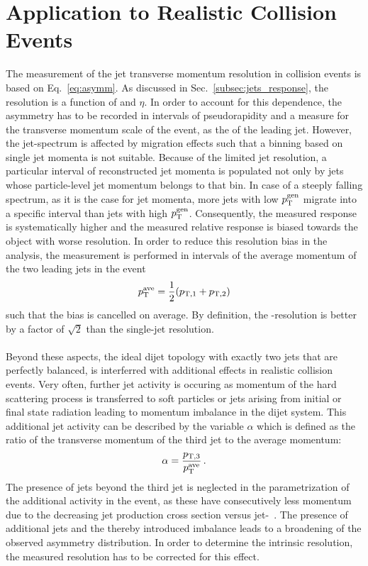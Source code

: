 \section{Application to Realistic Collision Events}
\label{sec:jer_application}
The measurement of the jet transverse momentum resolution in collision events is based on Eq.~\ref{eq:asymm}. As discussed in Sec.~\ref{subsec:jets_response}, the resolution is a function of \pt and $\eta$. In order to account for this dependence, the asymmetry has to be recorded in intervals of pseudorapidity and a measure for the transverse momentum scale of the event, as \eg the \pt of the leading jet. However, the jet-\pt spectrum is affected by migration effects such that a binning based on single jet momenta is not suitable. Because of the limited jet resolution, a particular interval of reconstructed jet momenta is populated not only by jets whose particle-level jet momentum belongs to that bin. In case of a steeply falling spectrum, as it is the case for jet momenta, more jets with low $p_{\text{T}}^\mathrm{gen}$ migrate into a specific interval than jets with high $p_{\text{T}}^\mathrm{gen}$. Consequently, the measured response is systematically higher and the measured relative response is biased towards the object with worse resolution. In order to reduce this resolution bias in the analysis, the measurement is performed in intervals of the average momentum of the two leading jets in the event
\begin{equation}
p^{\text{ave}}_{\text{T}} = \frac{1}{2}(p_\mathrm{T,1} + p_\mathrm{T,2}) 
\end{equation}
such that the bias is cancelled on average. By definition, the \ptave-resolution is better by a factor of $\sqrt{2}$ than the single-jet resolution.\\
\\
Beyond these aspects, the ideal dijet topology with exactly two jets that are perfectly balanced, is interferred with additional effects in realistic collision events. Very often, further jet activity is occuring as momentum of the hard scattering process is transferred to soft particles or jets arising from initial or final state radiation leading to momentum imbalance in the dijet system. This additional jet activity can be described by the variable $\alpha$ which is defined as the ratio of the transverse momentum of the third jet to the average momentum: 
 \begin{equation}
\label{eq:alpha}
\alpha = \frac{p_\mathrm{T,3}}{p_{\text{T}}^\mathrm{ave}} \, .
\end{equation}
The presence of jets beyond the third jet is neglected in the parametrization of the additional activity in the event, as these have consecutively less momentum due to the decreasing jet production cross section versus jet-\pt~\cite{CMS-PAS-QCD-11-004}. The presence of additional jets and the thereby introduced imbalance leads to a broadening of the observed asymmetry distribution. In order to determine the intrinsic resolution, the measured resolution has to be corrected for this effect. \\
